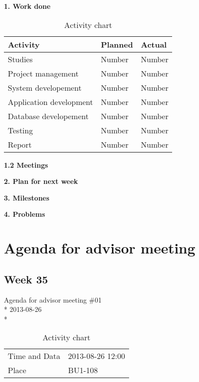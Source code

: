 \textbf{1. Work done}

\begin{table}[H]
\begin{center}
\begin{tabular}{ l | l | l }
  \hline
  Activity & Planned & Actual \\
  \hline\noalign{\smallskip}\noalign{\smallskip}\hline
  Studies & Number & Number \\
  Project management & Number & Number \\
  System developement & Number & Number \\
  Application development & Number & Number \\
  Database developement & Number & Number \\
  Testing & Number & Number \\
  Report & Number & Number \\
  \hline
\end{tabular}
\end{center}
\caption{Activity chart}
\label{table:activityChartStatusReport}
\end{table}

\textbf{1.2 Meetings}

\textbf{2. Plan for next week}

\textbf{3. Milestones}

\textbf{4. Problems}

\fi


\newpage

\section{Agenda for advisor meeting}
\subsection{Week 35}

\begin{center}
Agenda for advisor meeting \#01\\*
2013-08-26\\*
\end{center}

\begin{table}[H]
\begin{center}
\begin{tabular}{ l | l }
Time and Data & 2013-08-26 12:00 \\
Place & BU1-108 \\
\end{tabular}
\end{center}
\caption{Activity chart}
\label{table:activityChartAdvisorAgendaWeek35}
\end{table}

